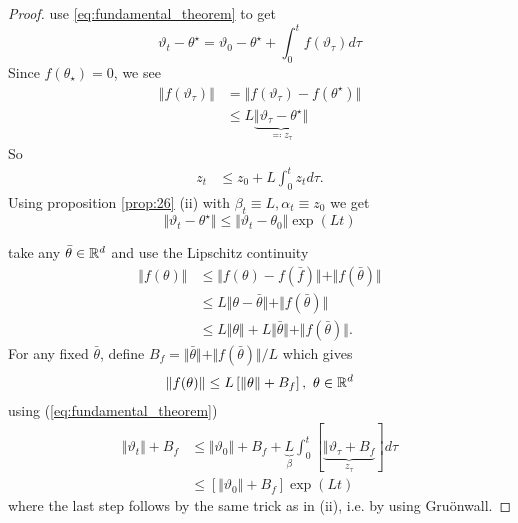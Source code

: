\begin{proof}
     use \ref{eq:fundamental_theorem} to get 
    \[\vartheta_t-\theta^\star=\vartheta_0-\theta^\star+\int_0^tf(\vartheta_\tau)d\tau\]
    Since \(f(\theta_\star)=0\), we see 
    \begin{align*}
        \Vert f(\vartheta_\tau)\Vert &= \Vert f(\vartheta_\tau)-f(\theta^\star)\Vert\\
        &\leq L\underbrace{\Vert \vartheta_\tau-\theta^\star\Vert}_{\eqqcolon z_\tau}
    \end{align*}
    So 
    \begin{align*}
        z_t&\leq z_0+L \int_0^t z_t d\tau.
    \end{align*}
    Using proposition \ref{prop:26} (ii) with \(\beta_t\equiv L,\alpha_t\equiv z_0\)
    we get \[\Vert \vartheta_t-\theta^\star\Vert\leq \Vert \vartheta_t-\theta_0\Vert\exp(Lt)\]
    
     take any \(\bar{\theta}\in\mathbb{R}^d\) and use the Lipschitz continuity 
    \begin{align*}
        \Vert f(\theta)\Vert &\leq \Vert f(\theta)-f(\bar{f})\Vert +\Vert f(\bar{\theta})\Vert \\
        &\leq L\Vert \theta-\bar{\theta}\Vert + \Vert f(\bar{\theta})\Vert \\
        &\leq L\Vert \theta\Vert + L\Vert \bar{\theta}\Vert + \Vert f(\bar\theta)\Vert.
    \end{align*} 
    For any fixed \(\bar{\theta}\), define \(B_f=\Vert \bar{\theta}\Vert + \Vert f(\bar\theta)\Vert/L\)
    which gives 
    \begin{align*}
        \Vert f(\theta)\Vert \leq L \left[\Vert \theta\Vert + B_f\right],\ \theta\in\mathbb{R}^d
    \end{align*}
    using (\ref{eq:fundamental_theorem})
    \begin{align*}
        \Vert \vartheta_t\Vert +B_f &\leq \Vert \vartheta_0\Vert + B_f +\underbrace{L}_\beta\int_0^t \left[\underbrace{\Vert\vartheta_\tau+ B_f}_{z_\tau}\right]d\tau\\
        &\leq \left[\Vert \vartheta_0\Vert +B_f\right]\exp(Lt) 
    \end{align*}
    where the last step follows by the same trick as in (ii), i.e. by using Gruönwall.
\end{proof}

